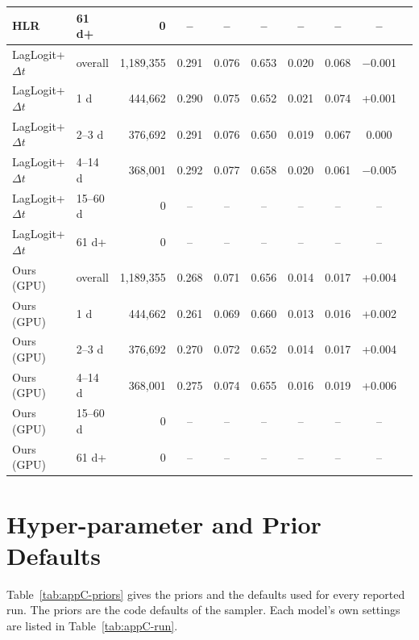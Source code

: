 \begin{table}[htbp]
\begin{tabular}{@{}llrccccccc@{}}
    HLR & 61 d+ & 0 & -- & -- & -- & -- & -- & -- \\
    \midrule
    LagLogit+$\Delta t$ & overall & 1,189,355 & 0.291 & 0.076 & 0.653 & 0.020 & 0.068 & $-$0.001 \\
    LagLogit+$\Delta t$ & 1 d & 444,662 & 0.290 & 0.075 & 0.652 & 0.021 & 0.074 & +0.001 \\
    LagLogit+$\Delta t$ & 2--3 d & 376,692 & 0.291 & 0.076 & 0.650 & 0.019 & 0.067 & 0.000 \\
    LagLogit+$\Delta t$ & 4--14 d & 368,001 & 0.292 & 0.077 & 0.658 & 0.020 & 0.061 & $-$0.005 \\
    LagLogit+$\Delta t$ & 15--60 d & 0 & -- & -- & -- & -- & -- & -- \\
    LagLogit+$\Delta t$ & 61 d+ & 0 & -- & -- & -- & -- & -- & -- \\
    \midrule
    Ours (GPU) & overall & 1,189,355 & 0.268 & 0.071 & 0.656 & 0.014 & 0.017 & +0.004 \\
    Ours (GPU) & 1 d & 444,662 & 0.261 & 0.069 & 0.660 & 0.013 & 0.016 & +0.002 \\
    Ours (GPU) & 2--3 d & 376,692 & 0.270 & 0.072 & 0.652 & 0.014 & 0.017 & +0.004 \\
    Ours (GPU) & 4--14 d & 368,001 & 0.275 & 0.074 & 0.655 & 0.016 & 0.019 & +0.006 \\
    Ours (GPU) & 15--60 d & 0 & -- & -- & -- & -- & -- & -- \\
    Ours (GPU) & 61 d+ & 0 & -- & -- & -- & -- & -- & -- \\
    \bottomrule
  \end{tabular}
\end{table}


\chapter{Hyper-parameter and Prior Defaults}
\label{app:priors}

Table~\ref{tab:appC-priors} gives the priors and the defaults used for every reported run. The priors are the code defaults of the
sampler. Each model's own settings are listed in Table~\ref{tab:appC-run}.

